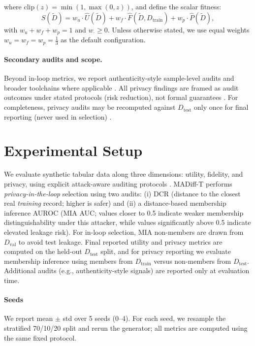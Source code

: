 \documentclass[preprint,12pt]{elsarticle}
\begin{document}
where $\mathrm{clip}(z)=\min(1,\max(0,z))$, and define the scalar fitness:
\begin{equation}
S(\tilde{D}) = w_u \cdot \hat{U}(\tilde{D}) + w_f \cdot \hat{F}(\tilde{D},D_{\text{train}}) + w_p \cdot \hat{P}(\tilde{D}),
\label{eq:fitness}
\end{equation}
with $w_u+w_f+w_p=1$ and $w_{\cdot}\ge 0$. Unless otherwise stated, we use equal weights 
$w_u = w_f = w_p = \frac{1}{3}$ as the default configuration.

\paragraph{Secondary audits and scope.}
Beyond in-loop metrics, we report authenticity-style sample-level audits and broader toolchains where applicable \cite{Alaa2022,lautrup2025syntheval}. All privacy findings are framed as audit outcomes under stated protocols (risk reduction), not formal guarantees \cite{Hernandez2025}. For completeness, privacy audits may be recomputed against $D_{\text{test}}$ only once for final reporting (never used in selection) \cite{Hyrup2025}.


\section{Experimental Setup}
\label{sec:experiments}

We evaluate synthetic tabular data along three dimensions: utility, fidelity, and privacy, using explicit attack-aware auditing protocols \cite{Hernandez2025,Hyrup2025}. MADiff-T performs \emph{privacy-in-the-loop} selection using two audits: (i) DCR (distance to the closest real \emph{training} record; higher is safer) and (ii) a distance-based membership inference AUROC (MIA AUC; values closer to 0.5 indicate weaker membership distinguishability under this attacker, while values significantly above 0.5 indicate elevated leakage risk). For in-loop selection, MIA non-members are drawn from $D_{\text{val}}$ to avoid test leakage. Final reported utility and privacy metrics are computed on the held-out $D_{\text{test}}$ split, and for privacy reporting we evaluate membership inference using members from $D_{\text{train}}$ versus non-members from $D_{\text{test}}$. Additional audits (e.g., authenticity-style signals) are reported only at evaluation time.
\paragraph{Seeds} We report mean $\pm$ std over 5 seeds (0--4). For each seed, we resample the stratified 70/10/20 split and rerun the generator; all metrics are computed using the same fixed protocol.
\end{document}
